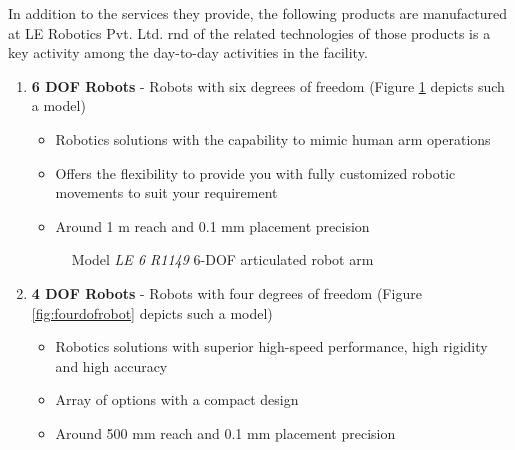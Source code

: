 \documentclass[a4paper,12pt]{report}%
\begin{document}
In addition to the services they provide, the following products are manufactured at LE Robotics Pvt. Ltd. \ac{rnd} of the related technologies of those products is a key activity among the day-to-day activities in the facility. 


\begin{enumerate}
	\item \textbf{6 DOF Robots} - Robots with six degrees of freedom (Figure \ref{fig:sixdofrobot} depicts such a model)
	\begin{itemize}
		\item Robotics solutions with the capability to mimic human arm operations
		\item Offers the flexibility to provide you with fully customized robotic movements to suit your requirement
		\item  Around 1 m reach and 0.1 mm placement precision
	\end{itemize}
	
	\begin{figure}[h]
		\centering
		\caption{Model \textit{LE 6 R1149} 6-DOF articulated robot arm\cite{articlulated_robots}}
		\label{fig:sixdofrobot}
	\end{figure}
	
	
	
	\item\textbf{ 4 DOF Robots} - Robots with four degrees of freedom (Figure \ref{fig:fourdofrobot} depicts such a model)
	\begin{itemize}
		\item Robotics solutions with superior high-speed performance, high rigidity and high accuracy
		\item Array of options with a compact design
		\item Around 500 mm reach and 0.1 mm placement precision
	\end{itemize}


\end{enumerate}
\end{document}
